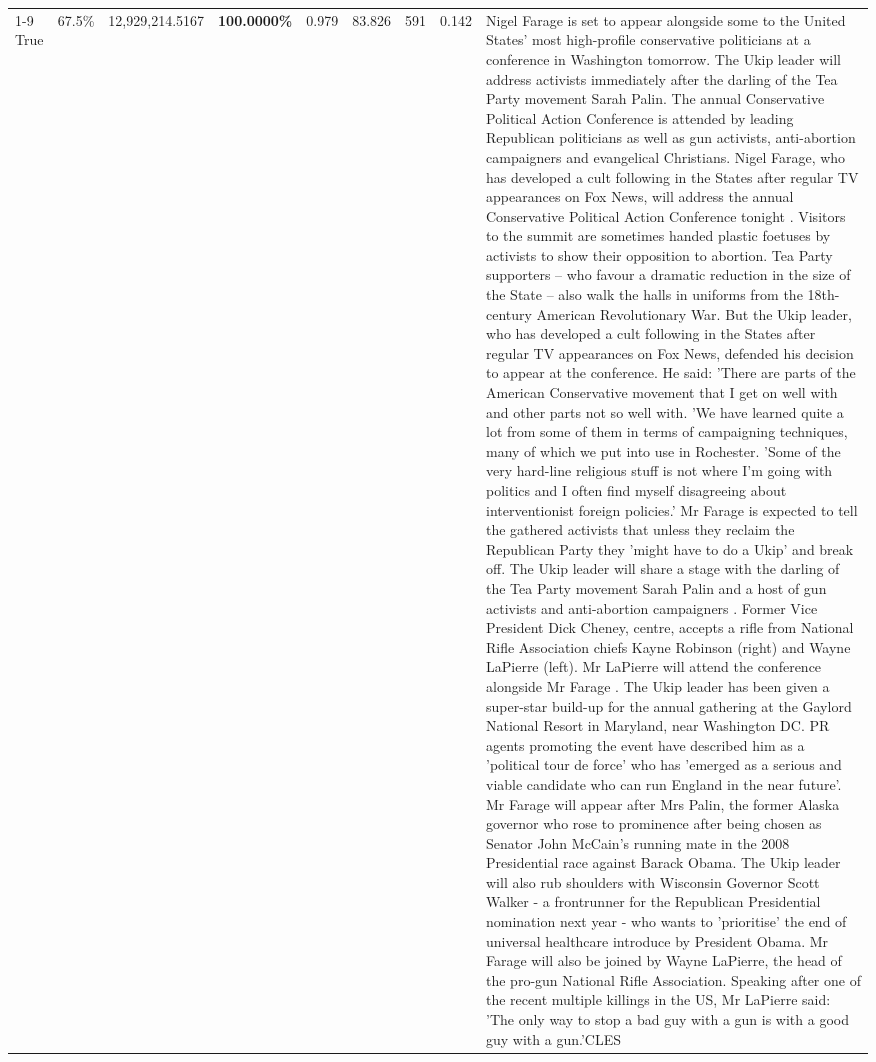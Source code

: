 \begin{table}[H]
\begin{tabular}{lllrlllll}
\cline{1-9} \cline{2-9}
True & 67.5\% & 12,929,214.5167 & \bfseries \color{red} 100.0000\% & 0.979 & 83.826 & 591 & 0.142 & Nigel Farage is set to appear alongside some to the United States' most high-profile conservative politicians at a conference in Washington tomorrow. The Ukip leader will address activists immediately after the darling of the Tea Party movement Sarah Palin. The annual Conservative Political Action Conference is attended by leading Republican politicians as well as gun activists, anti-abortion campaigners and evangelical Christians. Nigel Farage, who has developed a cult following in the States after regular TV appearances on Fox News, will address the annual Conservative Political Action Conference tonight . Visitors to the summit are sometimes handed plastic foetuses by activists to show their opposition to abortion. Tea Party supporters – who favour a dramatic reduction in the size of the State – also walk the halls in uniforms from the 18th-century American Revolutionary War. But the Ukip leader, who has developed a cult following in the States after regular TV appearances on Fox News, defended his decision to appear at the conference. He said: 'There are parts of the American Conservative movement that I get on well with and other parts not so well with. 'We have learned quite a lot from some of them in terms of campaigning techniques, many of which we put into use in Rochester. 'Some of the very hard-line religious stuff is not where I'm going with politics and I often find myself disagreeing about interventionist foreign policies.' Mr Farage is expected to tell the gathered activists that unless they reclaim the Republican Party they 'might have to do a Ukip' and break off. The Ukip leader will share a stage with the darling of the Tea Party movement Sarah Palin and a host of gun activists and anti-abortion campaigners . Former Vice President Dick Cheney, centre, accepts a rifle from National Rifle Association chiefs Kayne Robinson (right) and Wayne LaPierre (left). Mr LaPierre will attend the conference alongside Mr Farage . The Ukip leader has been given a super-star build-up for the annual gathering at the Gaylord National Resort in Maryland, near Washington DC. PR agents promoting the event have described him as a 'political tour de force' who has 'emerged as a serious and viable candidate who can run England in the near future'. Mr Farage will appear after Mrs Palin, the former Alaska governor who rose to prominence after being chosen as Senator John McCain's running mate in the 2008 Presidential race against Barack Obama. The Ukip leader will also rub shoulders with Wisconsin Governor Scott Walker - a frontrunner for the Republican Presidential nomination next year - who wants to 'prioritise' the end of universal healthcare introduce by President Obama. Mr Farage will also be joined by Wayne LaPierre, the head of the pro-gun National Rifle Association. Speaking after one of the recent multiple killings in the US, Mr LaPierre said: 'The only way to stop a bad guy with a gun is with a good guy with a gun.'CLES \\

\end{tabular}
\end{table}
